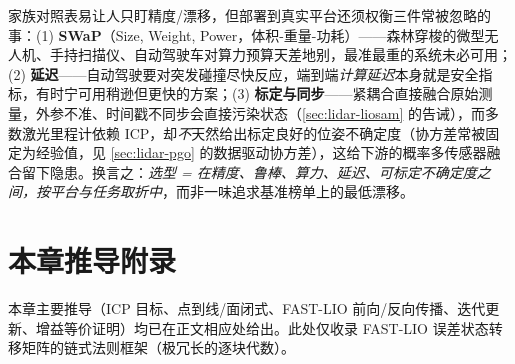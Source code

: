 \begin{insight}
家族对照表易让人只盯精度/漂移，但部署到真实平台还须权衡三件常被忽略的事\cite{carlone2026handbook}：(1) \textbf{SWaP}（Size, Weight, Power，体积-重量-功耗）——森林穿梭的微型无人机、手持扫描仪、自动驾驶车对算力预算天差地别，最准最重的系统未必可用；(2) \textbf{延迟}——自动驾驶要对突发碰撞尽快反应，端到端\emph{计算延迟}本身就是安全指标，有时宁可用稍逊但更快的方案；(3) \textbf{标定与同步}——紧耦合直接融合原始测量，外参不准、时间戳不同步会直接污染状态（\cref{sec:lidar-liosam} 的告诫），而多数激光里程计依赖 ICP，却\emph{不}天然给出标定良好的位姿不确定度（协方差常被固定为经验值，见 \cref{sec:lidar-pgo} 的数据驱动协方差），这给下游的概率多传感器融合留下隐患。换言之：\emph{选型 = 在精度、鲁棒、算力、延迟、可标定不确定度之间，按平台与任务取折中}，而非一味追求基准榜单上的最低漂移。
\end{insight}

\section{本章推导附录}
\label{sec:lidar-appendix}

本章主要推导（ICP 目标、点到线/面闭式、FAST-LIO 前向/反向传播、迭代更新、增益等价证明）均已在正文相应处给出。此处仅收录 FAST-LIO 误差状态转移矩阵的链式法则框架（极冗长的逐块代数）。

